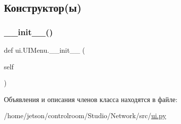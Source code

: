 \subsection{Конструктор(ы)}
\mbox{\label{classui_1_1_u_i_menu_ad0be15df979e3d015a770bd08f3da88b}} 
\subsubsection{\texorpdfstring{\+\_\+\+\_\+init\+\_\+\+\_\+()}{\_\_init\_\_()}}
{\footnotesize\ttfamily def ui.\+U\+I\+Menu.\+\_\+\+\_\+init\+\_\+\+\_\+ (\begin{DoxyParamCaption}\item[{}]{self }\end{DoxyParamCaption})}



Объявления и описания членов класса находятся в файле\+:\begin{DoxyCompactItemize}
\item 
/home/jetson/controlroom/\+Studio/\+Network/src/\hyperlink{ui_8py}{ui.\+py}\end{DoxyCompactItemize}
